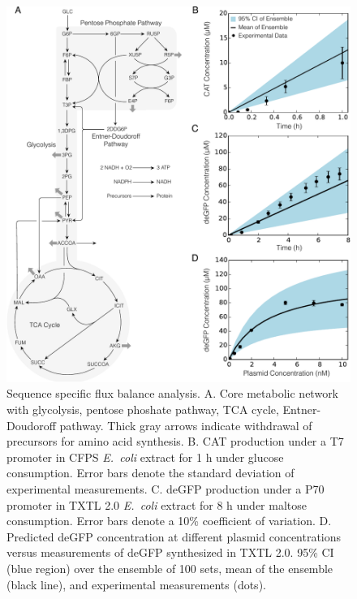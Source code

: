 \documentclass[journal=asbcd6,manuscript=article]{achemso}
\begin{document}
\begin{figure}[t!]
\centering
\includegraphics[width=1.00\textwidth]{./figs/Fig-1-Network-Validation-Simulations.pdf}
\caption{Sequence specific flux balance analysis. A. Core metabolic network with glycolysis, pentose phoshate pathway, TCA cycle, Entner-Doudoroff pathway. Thick gray arrows indicate withdrawal of precursors for amino acid synthesis. B. CAT production under a T7 promoter in CFPS \textit{E.~coli} extract for 1 h under glucose consumption. Error bars denote the standard deviation of experimental measurements. C. deGFP production under a P70 promoter in TXTL 2.0 \textit{E.~coli} extract for 8 h under maltose consumption. Error bars denote a 10\% coefficient of variation. D. Predicted deGFP concentration at different plasmid concentrations versus measurements of deGFP synthesized in TXTL 2.0. 95\% CI (blue region) over the ensemble of 100 sets, mean of the ensemble (black line), and experimental measurements (dots).}
\label{fig:network}
\end{figure}
\end{document}
